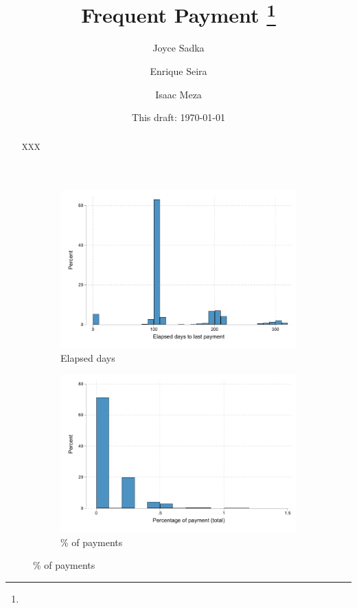 \documentclass[11pt]{article}
\begin{document}
\title{Frequent Payment \thanks{}}
\author{Joyce Sadka \and Enrique Seira \and Isaac Meza }
\date{This draft:  \today \\[2 cm]}



\maketitle
\begin{abstract}
XXX 
\end{abstract}


\begin{figure}[H]
    \caption{}
    \label{det_naiveness}
    \begin{center}
    \begin{subfigure}{0.45\textwidth}
        \caption{Elapsed days}
        \centering
        \includegraphics[width=\textwidth]{Figuras/hist_days_default.pdf}
    \end{subfigure}
        \begin{subfigure}{0.45\textwidth}
        \caption{\% of payments}
        \centering
        \includegraphics[width=\textwidth]{Figuras/hist_percpay_default.pdf}

\end{subfigure}
\end{center}
\end{figure}
\end{document}
